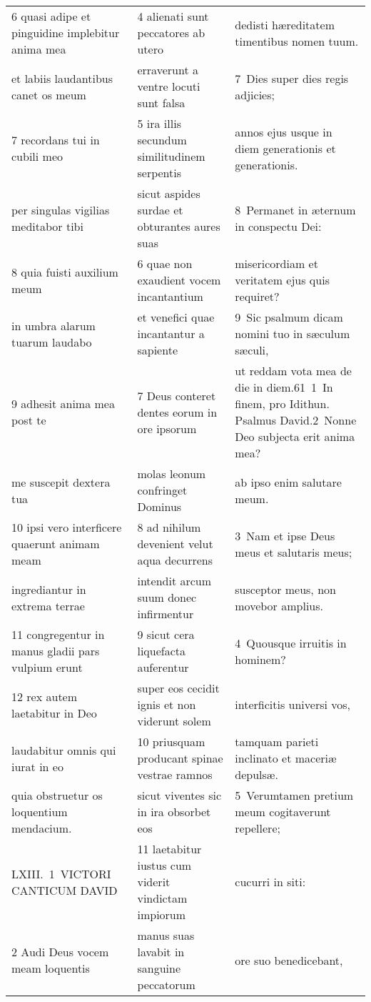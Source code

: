 \documentclass{article}
\begin{document}
\begin{longtable}{@{}p{}p{}p{}@{}}
6 quasi adipe et pinguidine implebitur anima mea	&	4 alienati sunt peccatores ab utero	&	dedisti hæreditatem timentibus nomen tuum.	\\
et labiis laudantibus canet os meum	&	erraverunt a ventre locuti sunt falsa	&	7 Dies super dies regis adjicies;	\\
7 recordans tui in cubili meo	&	5 ira illis secundum similitudinem serpentis	&	annos ejus usque in diem generationis et generationis.	\\
per singulas vigilias meditabor tibi	&	sicut aspides surdae et obturantes aures suas	&	8 Permanet in æternum in conspectu Dei:	\\
8 quia fuisti auxilium meum	&	6 quae non exaudient vocem incantantium	&	misericordiam et veritatem ejus quis requiret?	\\
in umbra alarum tuarum laudabo	&	et venefici quae incantantur a sapiente	&	9 Sic psalmum dicam nomini tuo in sæculum sæculi,	\\
9 adhesit anima mea post te	&	7 Deus conteret dentes eorum in ore ipsorum	&	ut reddam vota mea de die in diem.61 1 In finem, pro Idithun. Psalmus David.2 Nonne Deo subjecta erit anima mea?	\\
me suscepit dextera tua	&	molas leonum confringet Dominus	&	ab ipso enim salutare meum.	\\
10 ipsi vero interficere quaerunt animam meam	&	8 ad nihilum devenient velut aqua decurrens	&	3 Nam et ipse Deus meus et salutaris meus;	\\
ingrediantur in extrema terrae	&	intendit arcum suum donec infirmentur	&	susceptor meus, non movebor amplius.	\\
11 congregentur in manus gladii pars vulpium erunt	&	9 sicut cera liquefacta auferentur	&	4 Quousque irruitis in hominem?	\\
12 rex autem laetabitur in Deo	&	super eos cecidit ignis et non viderunt solem	&	interficitis universi vos,	\\
laudabitur omnis qui iurat in eo	&	10 priusquam producant spinae vestrae ramnos	&	tamquam parieti inclinato et maceriæ depulsæ.	\\
quia obstruetur os loquentium mendacium.	&	sicut viventes sic in ira obsorbet eos	&	5 Verumtamen pretium meum cogitaverunt repellere;	\\
LXIII. 1 VICTORI CANTICUM DAVID	&	11 laetabitur iustus cum viderit vindictam impiorum	&	cucurri in siti:	\\
2 Audi Deus vocem meam loquentis	&	manus suas lavabit in sanguine peccatorum	&	ore suo benedicebant,	\\

\end{longtable}
\end{document}
